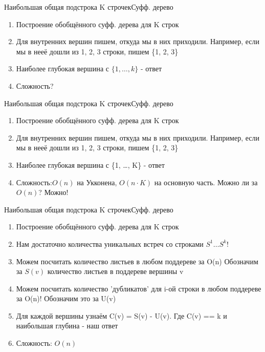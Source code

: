 \documentclass[10pt]{beamer}
\begin{document}
\begin{frame}[fragile]{Наибольшая общая подстрока K строчек}{Суфф. дерево}
\begin{enumerate}
    \item Построение обобщённого суфф. дерева для K строк
    \item Для внутренних вершин пишем, откуда мы в них приходили. Например, если мы в нееё дошли из 1, 2, 3 строки, пишем \{1, 2, 3\}
    \item Наиболее глубокая вершина с $\{1, \dots, k\}$ - ответ
    \item Сложность?
\end{enumerate}
\end{frame}

\begin{frame}[fragile]{Наибольшая общая подстрока K строчек}{Суфф. дерево}
\begin{enumerate}
    \item Построение обобщённого суфф. дерева для K строк
    \item Для внутренних вершин пишем, откуда мы в них приходили. Например, если мы в нееё дошли из 1, 2, 3 строки, пишем \{1, 2, 3\}
    \item Наиболее глубокая вершина с \{1, \dots, K\} - ответ
    \item Сложность:$O(n)$ на Укконена, $O(n \cdot K)$ на основную часть. Можно ли за $O(n)$? Можно!
\end{enumerate}
\end{frame}

\begin{frame}[fragile]{Наибольшая общая подстрока K строчек}{Суфф. дерево}
\begin{enumerate}
    \item Построение обобщённого суфф. дерева для K строк
    \item Нам достаточно количества уникальных встреч со строками $S^1 \dots S^k$!
    \item Можем посчитать количество листьев в любом поддереве за O(n) Обозначим за $S(v)$ количество листьев в поддереве вершины v
    \item Можем посчитать количество 'дубликатов' для i-ой строки в любом поддереве за O(n)! Обозначим это за U(v)
    \item Для каждой вершины узнаём C(v) = S(v) - U(v). Где C(v) == k и наибольшая глубина - наш ответ
    \item Сложность: $O(n)$
\end{enumerate}
\end{frame}
\end{document}
